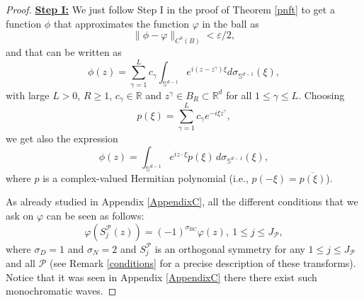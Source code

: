 \documentclass{amsart}
\theoremstyle{definition}
\theoremstyle{remark}
\newcommand{\ep}{\varepsilon}
\newcommand{\si}{\sigma}
\newcommand{\vp}{\varphi}
\renewcommand\leq\leqslant
\renewcommand\geq\geqslant
\numberwithin{equation}{section}
\theoremstyle{definition}
\theoremstyle{remark}
\begin{document}
\begin{proof}
	
\textbf{	\underline{Step I:}}
	We just follow Step I in the proof of Theorem \ref{pnft} to get a function $\phi$ that	approximates the function $\vp$ in the ball as
	\begin{equation}
		\|\phi-\varphi\|_{C^k(B)}<\ep/2,
	\end{equation}
	and that can be written as 
	\begin{equation}
		\phi(z)=\sum_{\gamma=1}^{L} c_\gamma\int_{\mathbb{S}^{d-1}}e^{i(z-z^\gamma)\xi}d\sigma_{\mathbb{S}^{d-1}}(\xi),
	\end{equation}
	with large $L>0$, $R\geq 1$, ${c}_\gamma\in\mathbb{R}$ and $z^\gamma\in B_R\subset\mathbb{R}^d$ for all $1\leq \gamma\leq L$.
	Choosing \begin{equation}
		p(\xi)=\sum_{\gamma=1}^{L} c_\gamma e^{-i\xi z^\gamma},
	\end{equation}we get also the expression
	\begin{equation}\label{HermitianpolyII}
		\phi(z)=\int_{\mathbb{S}^{d-1}} e^{i z\cdot\xi} p(\xi) \, d\si_{\mathbb{S}^{d-1}}(\xi),
	\end{equation}
	where $p$ is a complex-valued Hermitian polynomial (i.e., $p(-\xi)=\overline{p(\xi)}$).
	
	As already studied in Appendix \ref{AppendixC}, all the different conditions that we ask on $\vp$ can be seen as follows:\begin{equation}
		\vp\left(S^{\mathcal{P}}_j\left(z\right)\right)=\left(-1\right)^{\sigma_\mathrm{BC}}\vp(z),\ 1\leq j\leq J_\mathcal{P},
	\end{equation}
	where $\sigma_D=1$ and $\sigma_N=2$ and $S^\mathcal{P}_j$ is an orthogonal symmetry for any $1\leq j\leq J_\mathcal{P}$ and all $\mathcal{P}$ (see Remark \ref{conditions} for a precise description of these transforms). Notice that it was seen in Appendix \ref{AppendixC} there there exist such monochromatic waves.
	

\end{proof}
\end{document}
